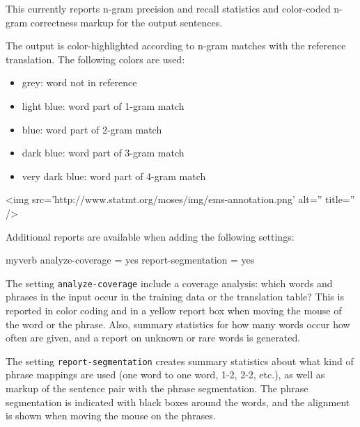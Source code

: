 This currently reports n-gram precision and recall statistics and color-coded n-gram correctness markup for the output sentences.



The output is color-highlighted according to n-gram matches with the reference translation. The following colors are used:

\begin{itemize}
\item grey: word not in reference

\item light blue: word part of 1-gram match

\item blue: word part of 2-gram match

\item dark blue: word part of 3-gram match

\item very dark blue: word part of 4-gram match

\end{itemize}






<img src='http://www.statmt.org/moses/img/ems-annotation.png' alt='' title='' />



Additional reports are available when adding the following settings:






\begin{SaveVerbatim}{myverb}
 analyze-coverage = yes
 report-segmentation = yes
\end{SaveVerbatim}
\colorbox{gray}{%
}

The setting {\tt analyze-coverage} include a coverage analysis: which words and phrases in the input occur in the training data or the translation table? This is reported in color coding and in a yellow report box when moving the mouse of the word or the phrase. Also, summary statistics for how many words occur how often are given, and a report on unknown or rare words is generated.



The setting {\tt report-segmentation} creates summary statistics about what kind of phrase mappings are used (one word to one word, 1-2, 2-2, etc.), as well as markup of the sentence pair with the phrase segmentation. The phrase segmentation is indicated with black boxes around the words, and the alignment is shown when moving the mouse on the phrases.







